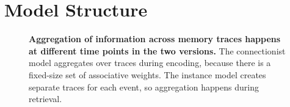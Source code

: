 \documentclass[
  letterpaper,
  11pt,
  english,
  singlespacing,
  headsepline]{MastersDoctoralThesis}
\begin{document}
\section{Model Structure}\label{model-structure}

\begin{figure}

\begin{minipage}{\linewidth}



\end{minipage}%
\newline
\begin{minipage}{\linewidth}



\end{minipage}%

\caption{\label{fig-comparison}\textbf{Aggregation of information across
memory traces happens at different time points in the two versions.} The
connectionist model aggregates over traces during encoding, because
there is a fixed-size set of associative weights. The instance model
creates separate traces for each event, so aggregation happens during
retrieval.}

\end{figure}%
\end{document}
